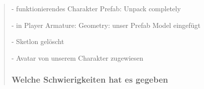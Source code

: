 \begin{quote}
		- funktionierendes Charakter Prefab: Unpack completely
		
		- in Player Armature: Geometry: unser Prefab Model eingefügt
		
		- Sketlon gelöscht
		
		- Avatar von unserem Charakter zugewiesen
	


	
	\subsubsection*{Welche Schwierigkeiten hat es gegeben}
	
\end{quote}

